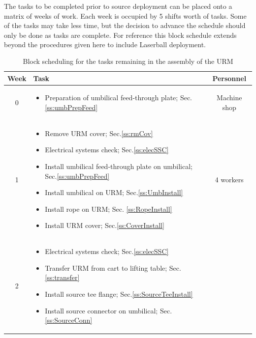 \documentclass[11pt]{article}
\begin{document}
The tasks to be completed prior to source deployment can be placed onto a matrix of weeks of work. Each week is occupied by 5 shifts worth of tasks. Some of the tasks may take less time, but the decision to advance the schedule should only be done as tasks are complete. For reference this block schedule extends beyond the procedures given here to include Laserball deployment. 
\begin{table}
  \caption{Block scheduling for the tasks remaining in the assembly of the URM}
  \begin{tabular}{|c|p{13cm}|c|}
    \hline
    Week & Task & Personnel \\
    \hline
    0 & \vspace{-0.7cm} \begin{itemize}[label={$\square$}]
    \item Preparation of umbilical feed-through plate; Sec.\ref{ss:umbPrepFeed} \end{itemize} \vspace{-0.5cm} & Machine shop \\ \hline
    1 & \vspace{-0.7cm} \begin{itemize}[label={$\square$}]
    \item Remove URM cover; Sec.\ref{ss:rmCov}
    \item Electrical systems check; Sec.\ref{ss:elecSSC} 
    \item Install umbilical feed-through plate on umbilical; Sec.\ref{ss:umbPrepFeed} 
    \item Install umbilical on URM; Sec.\ref{ss:UmbInstall}
    \item Install rope on URM; Sec. \ref{ss:RopeInstall} 
    \item Install URM cover; Sec.\ref{ss:CoverInstall} 
    \end{itemize} \vspace{-0.5cm} 
    & 4 workers \\\hline
    2 & \vspace{-0.7cm}\begin{itemize}[label={$\square$}]
    \item Electrical systems check; Sec.\ref{ss:elecSSC}
    \item Transfer URM from cart to lifting table; Sec.\ref{ss:transfer}
    \item Install source tee flange; Sec.\ref{ss:SourceTeeInstall}
    \item Install source connector on umbilical; Sec.\ref{ss:SourceConn}

\end{itemize}
\end{tabular}
\end{table}
\end{document}
